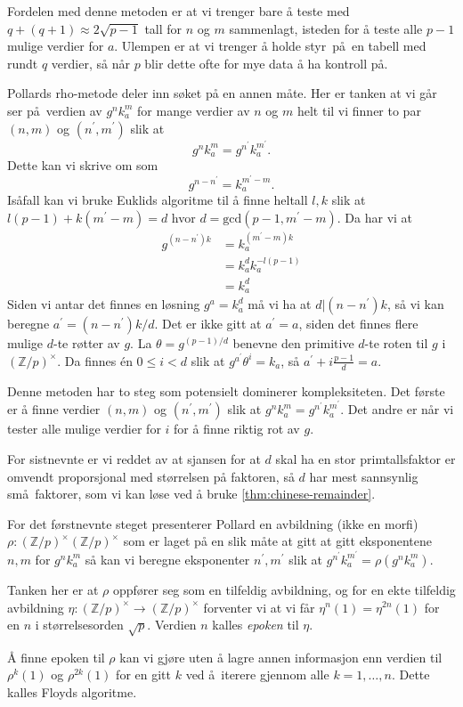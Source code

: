 Fordelen med denne metoden er at vi trenger bare å teste med
$q + (q + 1) \approx 2\sqrt{p - 1}$ tall for $n$ og $m$ sammenlagt,
isteden for å teste alle $p - 1$ mulige verdier for $a$.
Ulempen er at vi trenger å holde styr på en tabell med rundt $q$
verdier, så når $p$ blir dette ofte for mye data å ha kontroll på.

Pollards rho-metode \cite{pollard_monte_1978} deler inn søket på en annen måte.
Her er tanken at vi går ser på verdien av $g^n k_a^m$ for mange verdier av $n$ og $m$
helt til vi finner to par $(n,m)$ og $(n^\prime, m^\prime)$ slik at
\[
    g^n k_a^m = g^{n^\prime} k_a^{m^\prime}.
\]
Dette kan vi skrive om som
\[
    g^{n - n^\prime} = k_a^{m^\prime - m}.
\]
Isåfall kan vi bruke Euklids algoritme til å finne heltall $l, k$
slik at $l (p - 1) + k (m^\prime - m) = d$ hvor $d = \mathrm{gcd}(p - 1, m^\prime - m)$.
Da har vi at
\[\begin{aligned}
    g^{(n - n^\prime)k}
    &= k_a^{(m^\prime - m)k}
    \\
    &= k_a^d k_a^{-l(p - 1)}
    \\
    &= k_a^d
\end{aligned}\]
Siden vi antar det finnes en løsning $g^a = k_a^d$ må vi ha at $d | (n - n^\prime) k$,
så vi kan beregne $a^\prime = (n - n^\prime) k / d$.
Det er ikke gitt at $a^\prime = a$,
siden det finnes flere mulige $d$-te røtter av $g$.
La $\theta = g^{(p - 1) / d}$ benevne den primitive $d$-te roten til $g$
i ${(\mathbb Z / p)}^\times$.
Da finnes \'en $0\leq i < d$ slik at
$g^{a^\prime} \theta^i = k_a$,
så $a^\prime + i\frac {p - 1} d = a$.

Denne metoden har to steg som potensielt dominerer kompleksiteten.
Det første er å finne verdier $(n, m)$ og $(n^\prime, m^\prime)$
slik at $g^n k_a^m = g^{n^\prime} k_a^{m^\prime}$.
Det andre er når vi tester alle mulige verdier for $i$
for å finne riktig rot av $g$.

For sistnevnte er vi reddet av at sjansen for at $d$ skal ha en stor
primtallsfaktor er omvendt proporsjonal med størrelsen på faktoren,
så $d$ har mest sannsynlig små faktorer,
som vi kan løse ved å bruke \cref{thm:chinese-remainder}.

For det førstnevnte steget presenterer Pollard en avbildning (ikke en morfi)
$\rho \colon {(\mathbb Z / p)}^\times {(\mathbb Z / p)}^\times$
som er laget på en slik måte at gitt at gitt eksponentene $n, m$
for $g^n k_a^m$ så kan vi beregne eksponenter $n^\prime, m^\prime$
slik at $g^{n^\prime} k_a^{m^\prime} = \rho(g^n k_a^m)$.

Tanken her er at $\rho$ oppfører seg som en tilfeldig avbildning,
og for en ekte tilfeldig avbildning
$\eta\colon {(\mathbb Z / p)}^\times\to {(\mathbb Z / p)}^\times$
forventer vi at vi får $\eta^n(1) = \eta^{2n}(1)$
for en $n$ i størrelsesorden $\sqrt p$.
Verdien $n$ kalles \textit{epoken} til $\eta$.

Å finne epoken til $\rho$ kan vi gjøre uten å lagre annen informasjon
enn verdien til $\rho^k(1)$ og $\rho^{2k}(1)$
for en gitt $k$ ved å iterere
gjennom alle $k = 1,\dots,n$.
Dette kalles Floyds algoritme.
